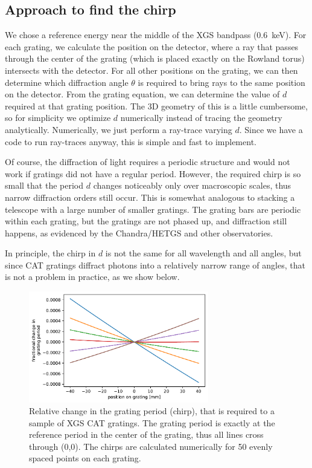 \documentclass[]{spie}  %
\begin{document}
\subsection{Approach to find the chirp}
We chose a reference energy near the middle of the XGS bandpass (0.6~keV). 
For each grating, we calculate the position on the detector, where a ray that passes through the center of the grating (which is placed exactly on the Rowland torus) intersects with the detector. For all other positions on the grating, we can then determine which diffraction angle $\theta$ is required to bring rays to the same position on the detector. From the grating equation, we can determine the value of $d$ required at that grating position. The 3D geometry of this is a little cumbersome, so for simplicity we optimize $d$ numerically instead of tracing the geometry analytically. Numerically, we just perform a ray-trace varying $d$. Since we have a code to run ray-traces anyway, this is simple and fast to implement.

Of course, the diffraction of light requires a periodic structure and would not work if gratings did not have a regular period. However, the required chirp is so small that the period $d$ changes noticeably only over macroscopic scales, thus narrow diffraction orders still occur. This is somewhat analogous to stacking a telescope with a large number of smaller gratings. The grating bars are periodic within each grating, but the gratings are not phased up, and diffraction still happens, as evidenced by the Chandra/HETGS and other observatories.

In principle, the chirp in $d$ is not the same for all wavelength and all angles, but since CAT gratings diffract photons into a relatively narrow range of angles, that is not a problem in practice, as we show below.

\begin{figure} [ht]
\begin{center}
\includegraphics[width=0.7\textwidth]{chirps}
\end{center}
\caption {\label{fig:chirps}
Relative change in the grating period (chirp), that is required to a sample of XGS CAT gratings. The grating period is exactly at the reference period in the center of the grating, thus all lines cross through (0,0). The chirps are calculated numerically for 50 evenly spaced points on each grating.
}
\end{figure}
\end{document}
